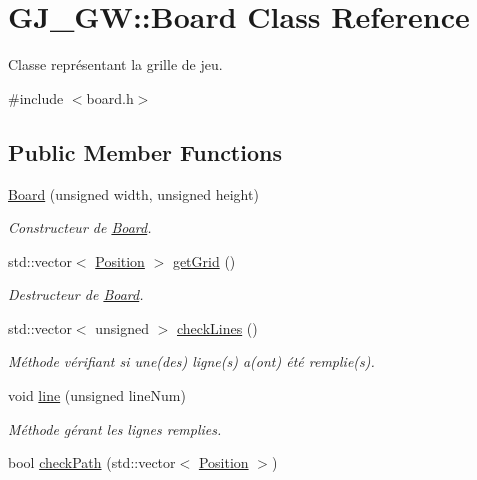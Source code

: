 \hypertarget{class_g_j___g_w_1_1_board}{}\section{G\+J\+\_\+\+GW\+:\+:Board Class Reference}
\label{class_g_j___g_w_1_1_board}


Classe représentant la grille de jeu.  




{\ttfamily \#include $<$board.\+h$>$}

\subsection*{Public Member Functions}
\begin{DoxyCompactItemize}
\item 
\hyperlink{class_g_j___g_w_1_1_board_a8029a10441779488fdace01047b27dcd}{Board} (unsigned width, unsigned height)
\begin{DoxyCompactList}\small\item\em Constructeur de \hyperlink{class_g_j___g_w_1_1_board}{Board}. \end{DoxyCompactList}\item 
std\+::vector$<$ \hyperlink{class_g_j___g_w_1_1_position}{Position} $>$ \hyperlink{class_g_j___g_w_1_1_board_a3360e1825ba9b116fbbca29db0b1464c}{get\+Grid} ()
\begin{DoxyCompactList}\small\item\em Destructeur de \hyperlink{class_g_j___g_w_1_1_board}{Board}. \end{DoxyCompactList}\item 
std\+::vector$<$ unsigned $>$ \hyperlink{class_g_j___g_w_1_1_board_aa613553d159cdf49805a7f083381f038}{check\+Lines} ()
\begin{DoxyCompactList}\small\item\em Méthode vérifiant si une(des) ligne(s) a(ont) été remplie(s). \end{DoxyCompactList}\item 
void \hyperlink{class_g_j___g_w_1_1_board_a54c122c1ebdd27a5f9375a673f436dab}{line} (unsigned line\+Num)
\begin{DoxyCompactList}\small\item\em Méthode gérant les lignes remplies. \end{DoxyCompactList}\item 
bool \hyperlink{class_g_j___g_w_1_1_board_ab8cf3ac1607e01c772e0637b7fa34da7}{check\+Path} (std\+::vector$<$ \hyperlink{class_g_j___g_w_1_1_position}{Position} $>$)

\end{DoxyCompactItemize}
